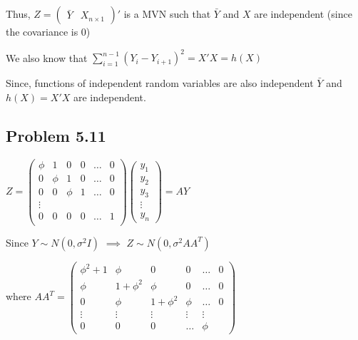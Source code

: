\documentclass[a4paper]{article}
\begin{document}
Thus, $Z=\begin{pmatrix}\bar{Y} & X_{n \times 1}\end{pmatrix}'$ is a MVN such that $\bar{Y}$ and $X$ are independent (since the covariance is 0)

We also know that $\sum_{i=1}^{n-1}(Y_i-Y_{i+1})^2=X'X = h(X)$

Since, functions of independent random variables are also independent $\bar{Y}$ and $h(X) = X'X$ are independent.

\subsection*{Problem 5.11}

$Z = \begin{pmatrix} \phi & 1 & 0 & 0 & \dots & 0\\ 0 & \phi & 1 & 0 & \dots & 0\\ 
0 & 0 & \phi & 1 &  \dots & 0\\ 
\vdots\\
0 & 0 & 0 & 0 & \dots & 1\\ 
\end{pmatrix} \begin{pmatrix} y_1\\ y_2 \\ y_3\\ \vdots\\ y_n\end{pmatrix} = AY$

Since $Y \sim N(0, \sigma^2I)$ $\implies$ $Z \sim N(0, \sigma^2 AA^T)$

where $AA^T = \begin{pmatrix}\phi^2+1 & \phi & 0 & 0 & \dots & 0\\ 
\phi & 1+\phi^2 & \phi & 0 & \dots & 0\\
0 & \phi & 1+\phi^2 & \phi & \dots & 0\\
\vdots & \vdots & \vdots & \vdots & \vdots\\
0 & 0 & 0 & \dots & \phi
\end{pmatrix}$
\end{document}
